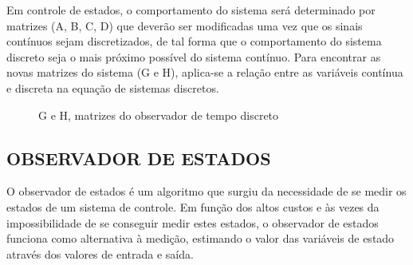 \documentclass[a4paper,12pt]{article}
\begin{document}
Em controle de estados, o comportamento do sistema será determinado por matrizes (A, B, C, D) que deverão ser modificadas uma vez que os sinais contínuos sejam discretizados, de tal forma que o comportamento do sistema discreto seja o mais próximo possível do sistema contínuo. Para encontrar as novas matrizes do sistema (G e H), aplica-se a relação entre as variáveis contínua e discreta na equação de sistemas discretos.

\begin{figure}[H]
     \centering
\hspace{1cm}
\hspace{1cm}
\hspace{1cm}
     \caption{G e H, matrizes do observador de tempo discreto}
     \label{fig:G_H}
\end{figure}

\subsection{OBSERVADOR DE ESTADOS}

\hspace{4ex}O observador de estados é um algoritmo que surgiu da necessidade de se medir os estados de um sistema de controle. Em função dos altos custos e às vezes da impossibilidade de se conseguir medir estes estados, o observador de estados funciona como alternativa à medição, estimando o valor das variáveis de estado através dos valores de entrada e saída.

\vspace{0.7cm}
\hspace{6ex}{\bf 1. Caso contínuo}
\end{document}
